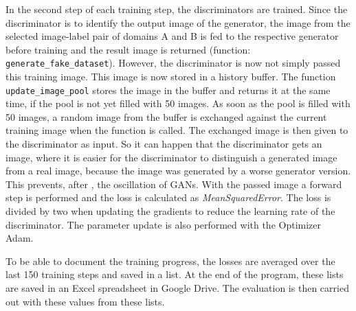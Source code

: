\documentclass[fleqn,10pt]{SelfArx} %
\begin{document}
In the second step of each training step, the discriminators are trained. Since the discriminator is to identify the output image of the generator, the image from the selected image-label pair of domains A and B is fed to the respective generator before training and the result image is returned (function: \texttt{generate\-\_fake\-\_data\-set}). However, the discriminator is now not simply passed this training image. This image is now stored in a history buffer. The function \texttt{update\_image\-\_pool} stores the image in the buffer and returns it at the same time, if the pool is not yet filled with 50 images. As soon as the pool is filled with 50 images, a random image from the buffer is exchanged against the current training image when the function is called. The exchanged image is then given to the discriminator as input. So it can happen that the discriminator gets an image, where it is easier for the discriminator to distinguish a generated image from a real image, because the image was generated by a worse generator version. This prevents, after \cite{oscillation}, the oscillation of \ac{GAN}s. With the passed image a forward step is performed and the loss is calculated as \textit{MeanSquaredError}. The loss is divided by two when updating the gradients to reduce the learning rate of the discriminator. The parameter update is also performed with the Optimizer Adam.~\cite{image-to-image-ccan, google-Adam, google-GradientTape}

To be able to document the training progress, the losses are averaged over the last 150 training steps and saved in a list. At the end of the program, these lists are saved in an Excel spreadsheet in Google Drive. The evaluation is then carried out with these values from these lists.
\end{document}
